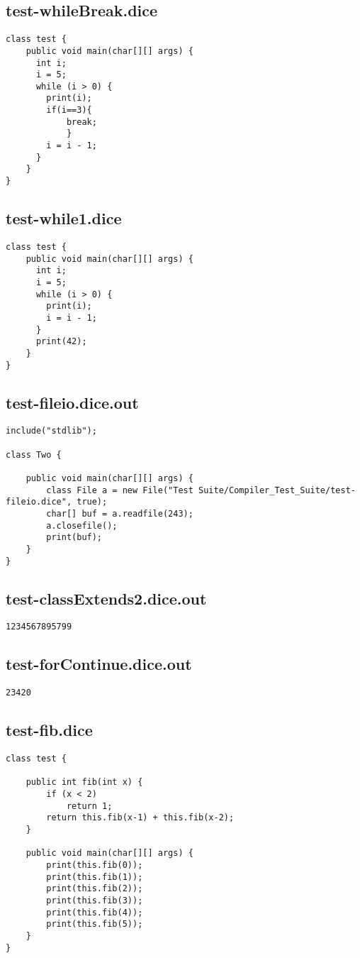 \subsection{test-whileBreak.dice}
\begin{verbatim}
class test {
	public void main(char[][] args) {
	  int i;
	  i = 5;
	  while (i > 0) {
	    print(i);
	    if(i==3){
	    	break;
	    	}
	    i = i - 1;
	  }
	}
}
\end{verbatim}
\pagebreak
\subsection{test-while1.dice}
\begin{verbatim}
class test {
	public void main(char[][] args) {
	  int i;
	  i = 5;
	  while (i > 0) {
	    print(i);
	    i = i - 1;
	  }
	  print(42);
	}
}
\end{verbatim}
\pagebreak
\subsection{test-fileio.dice.out}
\begin{verbatim}
include("stdlib");

class Two {

	public void main(char[][] args) {
        class File a = new File("Test Suite/Compiler_Test_Suite/test-fileio.dice", true);
        char[] buf = a.readfile(243);
        a.closefile();
        print(buf);
	}
}
\end{verbatim}
\pagebreak
\subsection{test-classExtends2.dice.out}
\begin{verbatim}
1234567895799
\end{verbatim}
\pagebreak
\subsection{test-forContinue.dice.out}
\begin{verbatim}
23420
\end{verbatim}
\pagebreak
\subsection{test-fib.dice}
\begin{verbatim}
class test {
	
	public int fib(int x) {
  		if (x < 2) 
  			return 1;
  		return this.fib(x-1) + this.fib(x-2);
	}

	public void main(char[][] args) {
		print(this.fib(0));
		print(this.fib(1));
		print(this.fib(2));
		print(this.fib(3));
		print(this.fib(4));
		print(this.fib(5));
	}
}
\end{verbatim}
\pagebreak
